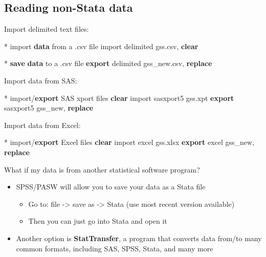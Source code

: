 \documentclass[
]{book}
\newenvironment{Shaded}{\begin{snugshade}}{\end{snugshade}}
\newcommand{\KeywordTok}[1]{\textcolor[rgb]{0.13,0.29,0.53}{\textbf{#1}}}
\newcommand{\NormalTok}[1]{#1}
\providecommand{\tightlist}{%
  \setlength{\itemsep}{0pt}\setlength{\parskip}{0pt}}
\begin{document}
\hypertarget{reading-non-stata-data}{%
\subsection{Reading non-Stata data}\label{reading-non-stata-data}}

Import delimited text files:

\begin{Shaded}
\begin{Highlighting}[]
\NormalTok{* import }\KeywordTok{data}\NormalTok{ from a .csv file}
\NormalTok{import delimited gss.csv, }\KeywordTok{clear}

\NormalTok{* }\KeywordTok{save} \KeywordTok{data}\NormalTok{ to a .csv file}
\KeywordTok{export}\NormalTok{ delimited gss_new.csv, }\KeywordTok{replace}
\end{Highlighting}
\end{Shaded}

Import data from SAS:

\begin{Shaded}
\begin{Highlighting}[]
\NormalTok{* import/}\KeywordTok{export}\NormalTok{ SAS xport files}
\KeywordTok{clear}
\NormalTok{import sasxport5 gss.xpt}
\KeywordTok{export}\NormalTok{ sasxport5 gss_new, }\KeywordTok{replace}
\end{Highlighting}
\end{Shaded}

Import data from Excel:

\begin{Shaded}
\begin{Highlighting}[]
\NormalTok{* import/}\KeywordTok{export}\NormalTok{ Excel files}
\KeywordTok{clear}
\NormalTok{import excel gss.xlsx}
\KeywordTok{export}\NormalTok{ excel gss_new, }\KeywordTok{replace}
\end{Highlighting}
\end{Shaded}

What if my data is from another statistical software program?

\begin{itemize}
\tightlist
\item
  SPSS/PASW will allow you to save your data as a Stata file

  \begin{itemize}
  \tightlist
  \item
    Go to: file -\textgreater{} save as -\textgreater{} Stata (use most recent version available)
  \item
    Then you can just go into Stata and open it
  \end{itemize}
\item
  Another option is \textbf{StatTransfer}, a program that converts data from/to many common formats, including SAS, SPSS, Stata, and many more
\end{itemize}
\end{document}
